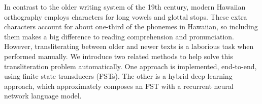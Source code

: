In contrast to the older writing system of the 19th century, modern Hawaiian orthography employs characters for long vowels and glottal stops. These extra characters account for about one-third of the phonemes in Hawaiian, so including them makes a big difference to reading comprehension and pronunciation. However, transliterating between older and newer texts is a laborious task when performed manually. We introduce two related methods to help solve this transliteration problem automatically. One approach is implemented, end-to-end, using finite state transducers (FSTs). The other is a hybrid deep learning approach, which approximately composes an FST with a recurrent neural network language model.
